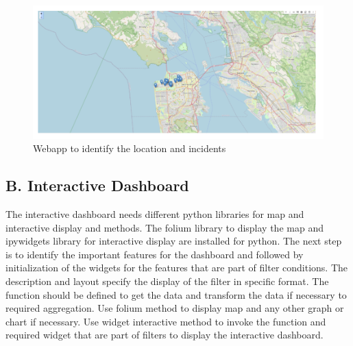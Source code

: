 \documentclass[11 pt,conference,final,]{IEEEtran}
\begin{document}
\begin{figure}

{\centering \includegraphics[width=0.95\linewidth]{img/fig14a} 

}

\caption{Webapp to identify the location and incidents}\label{fig:unnamed-chunk-18}
\end{figure}

\subsection{B. Interactive Dashboard}\label{b.-interactive-dashboard}

The interactive dashboard needs different python libraries for map and
interactive display and methods. The folium library to display the map
and ipywidgets library for interactive display are installed for python.
The next step is to identify the important features for the dashboard
and followed by initialization of the widgets for the features that are
part of filter conditions. The description and layout specify the
display of the filter in specific format. The function should be defined
to get the data and transform the data if necessary to required
aggregation. Use folium method to display map and any other graph or
chart if necessary. Use widget interactive method to invoke the function
and required widget that are part of filters to display the interactive
dashboard.
\end{document}
